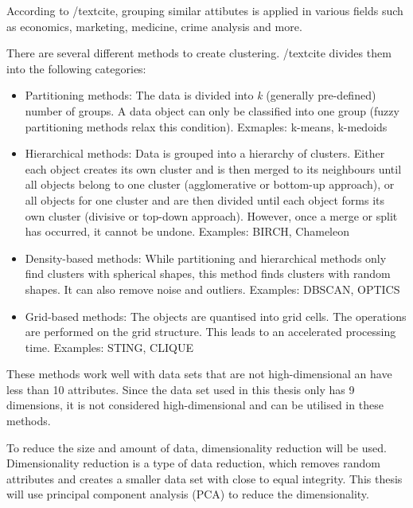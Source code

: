 \documentclass[12pt,a4paper]{article}
\begin{document}
According to /textcite, grouping similar attibutes is applied in various fields such as economics, marketing, medicine, crime analysis and more.




There are several different methods to create clustering. /textcite divides them into the following categories:
\begin{itemize}
	\item Partitioning methods: The data is divided into \textit{k} (generally pre-defined) number of groups. A data object can only be classified into one group (fuzzy partitioning methods relax this condition). Exmaples: k-means, k-medoids
	\item Hierarchical methods: Data is grouped into a hierarchy of clusters. Either each object creates its own cluster and is then merged to its neighbours until all objects belong to one cluster (agglomerative or bottom-up approach), or all objects for one cluster and are then divided until each object forms its own cluster (divisive or top-down approach). However, once a merge or split has occurred, it cannot be undone. Examples: BIRCH, Chameleon
	\item Density-based methods: While partitioning and hierarchical methods only find clusters with spherical shapes, this method finds clusters with random shapes. It can also remove noise and outliers. Examples: DBSCAN, OPTICS
	\item Grid-based methods: The objects are quantised into grid cells. The operations are performed on the grid structure. This leads to an accelerated processing time. Examples: STING, CLIQUE
\end{itemize}
These methods work well with data sets that are not high-dimensional an have less than 10 attributes. Since the data set used in this thesis only has 9 dimensions, it is not considered high-dimensional and can be utilised in these methods.


To reduce the size and amount of data, dimensionality reduction will be used. Dimensionality reduction is a type of data reduction, which removes random attributes and creates a smaller data set with close to equal integrity. This thesis will use principal component analysis (PCA) to reduce the dimensionality.
\end{document}
